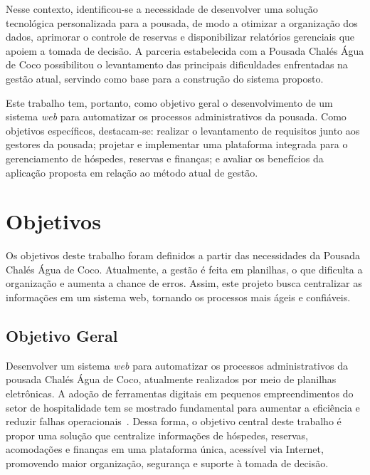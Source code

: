 \documentclass[
	12pt,				%
	openany,			%
	oneside,			%
	a4paper,			%
	english,			%
	french,				%
	spanish,			%
	brazil				%
	]{abntex2}
\begin{document}
Nesse contexto, identificou-se a necessidade de desenvolver uma solução tecnológica personalizada para a pousada, de modo a otimizar a organização dos dados, aprimorar o controle de reservas e disponibilizar relatórios gerenciais que apoiem a tomada de decisão. A parceria estabelecida com a Pousada Chalés Água de Coco possibilitou o levantamento das principais dificuldades enfrentadas na gestão atual, servindo como base para a construção do sistema proposto.

Este trabalho tem, portanto, como objetivo geral o desenvolvimento de um sistema \textit{web} para automatizar os processos administrativos da pousada. Como objetivos específicos, destacam-se: realizar o levantamento de requisitos junto aos gestores da pousada; projetar e implementar uma plataforma integrada para o gerenciamento de hóspedes, reservas e finanças; e avaliar os benefícios da aplicação proposta em relação ao método atual de gestão.

\section{Objetivos}
Os objetivos deste trabalho foram definidos a partir das necessidades da Pousada Chalés Água de Coco. Atualmente, a gestão é feita em planilhas, o que dificulta a organização e aumenta a chance de erros. Assim, este projeto busca centralizar as informações em um sistema web, tornando os processos mais ágeis e confiáveis.

\subsection{Objetivo Geral}
Desenvolver um sistema \textit{web} para automatizar os processos administrativos da pousada Chalés Água de Coco, atualmente realizados por meio de planilhas eletrônicas. A adoção de ferramentas digitais em pequenos empreendimentos do setor de hospitalidade tem se mostrado fundamental para aumentar a eficiência e reduzir falhas operacionais~\cite{totvs}. Dessa forma, o objetivo central deste trabalho é propor uma solução que centralize informações de hóspedes, reservas, acomodações e finanças em uma plataforma única, acessível via Internet, promovendo maior organização, segurança e suporte à tomada de decisão.
\end{document}
